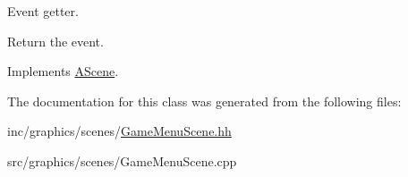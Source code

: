 Event getter. 

Return the event. 

Implements \hyperlink{classAScene_af521e5e6d30a5d2e5d30eb333e4d3abd}{A\+Scene}.



The documentation for this class was generated from the following files\+:\begin{DoxyCompactItemize}
\item 
inc/graphics/scenes/\hyperlink{GameMenuScene_8hh}{Game\+Menu\+Scene.\+hh}\item 
src/graphics/scenes/Game\+Menu\+Scene.\+cpp\end{DoxyCompactItemize}

